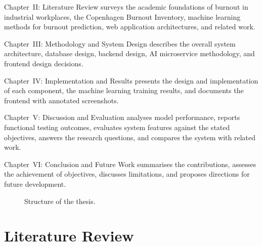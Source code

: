 \documentclass[12pt,a4paper]{article}
\begin{document}
Chapter~II: Literature Review surveys the academic foundations of
burnout in industrial workplaces, the Copenhagen Burnout Inventory, machine learning
methods for burnout prediction, web application architectures, and related
work.

Chapter~III: Methodology and System Design describes the overall
system architecture, database design, backend design, AI microservice
methodology, and frontend design decisions.

Chapter~IV: Implementation and Results presents the design and implementation
of each component, the machine learning training results, and
documents the frontend with annotated screenshots.

Chapter~V: Discussion and Evaluation analyses model performance,
reports functional testing outcomes, evaluates system features against the
stated objectives, answers the research questions, and compares the system
with related work.

Chapter~VI: Conclusion and Future Work summarises the
contributions, assesses the achievement of objectives, discusses
limitations, and proposes directions for future development.

\begin{figure}[H]
  \centering
  \singlespacing
  \caption{Structure of the thesis.}
  \label{fig:thesis-structure}
\end{figure}

\clearpage
\section{Literature Review}
\end{document}
